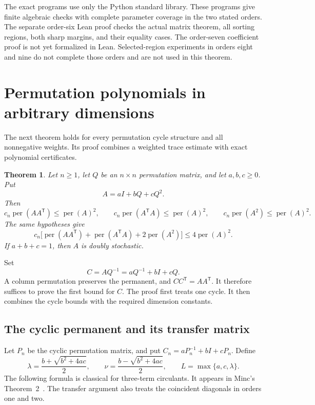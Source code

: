 \documentclass[11pt,a4paper]{article}
\newtheorem{theorem}{Theorem}[section]
\theoremstyle{definition}
\theoremstyle{remark}
\newcommand{\per}{\operatorname{per}}
\newcommand{\T}{\mathsf{T}}
\begin{document}
The exact programs use only the Python standard library.
These programs give finite algebraic checks with complete parameter coverage in the two stated orders.
The separate order-six Lean proof checks the actual matrix theorem, all sorting regions, both sharp margins, and their equality cases.
The order-seven coefficient proof is not yet formalized in Lean.
Selected-region experiments in orders eight and nine do not complete those orders and are not used in this theorem.


\section{Permutation polynomials in arbitrary dimensions}\label{sec:permutation}

The next theorem holds for every permutation cycle structure and all nonnegative weights.
Its proof combines a weighted trace estimate with exact polynomial certificates.

\begin{theorem}\label{thm:permutation-polynomial}
Let $n\ge1$, let $Q$ be an $n\times n$ permutation matrix, and let
$a,b,c\ge0$. Put
\[
A=aI+bQ+cQ^2.
\]
Then
\begin{equation}\label{eq:pp-gram-bounds}
c_n\per(AA^\T)\le\per(A)^2,
\qquad
c_n\per(A^\T A)\le\per(A)^2,
\qquad
c_n\per(A^2)\le\per(A)^2.
\end{equation}
The same hypotheses give
\begin{equation}\label{eq:pp-gyires}
c_n\bigl[\per(AA^\T)+\per(A^\T A)+2\per(A^2)\bigr]
\le4\per(A)^2.
\end{equation}
If $a+b+c=1$, then $A$ is doubly stochastic.
\end{theorem}

Set
\begin{equation}\label{eq:pp-column-shift}
C=AQ^{-1}=aQ^{-1}+bI+cQ.
\end{equation}
A column permutation preserves the permanent, and $CC^\T=AA^\T$.
It therefore suffices to prove the first bound for $C$.
The proof first treats one cycle.
It then combines the cycle bounds with the required dimension constants.

\subsection{The cyclic permanent and its transfer matrix}

Let $P_n$ be the cyclic permutation matrix, and put
$C_n=aP_n^{-1}+bI+cP_n$.
Define
\begin{equation}\label{eq:pp-roots}
\lambda=\frac{b+\sqrt{b^2+4ac}}2,
\qquad
\nu=\frac{b-\sqrt{b^2+4ac}}2,
\qquad
L=\max\{a,c,\lambda\}.
\end{equation}
The following formula is classical for three-term circulants.
It appears in Minc's Theorem~2~\cite{minc72}.
The transfer argument also treats the coincident diagonals in orders one and two.
\end{document}
